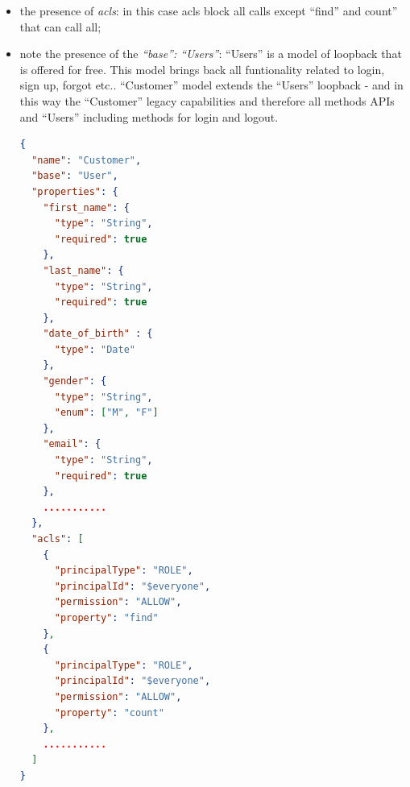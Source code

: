 \begin{itemize}
\begin{itemize}
\item the presence of \emph{acls}: in this case acls block all calls except “find” and count” that can call all;
\item note the presence of the \emph{“base”: “Users”}: “Users” is a model of loopback that is offered for free. This model brings back all funtionality related to login, sign up, forgot etc.. “Customer” model extends the “Users” loopback - and in this way the “Customer” legacy capabilities and therefore all methods APIs and “Users” including methods for login and logout.
\begin{lstlisting}[language=json]
{
  "name": "Customer",
  "base": "User",
  "properties": {
    "first_name": {
      "type": "String",
      "required": true
    },
    "last_name": {
      "type": "String",
      "required": true
    },
    "date_of_birth" : {
      "type": "Date"
    },
    "gender": {
      "type": "String",
      "enum": ["M", "F"]
    },
    "email": {
      "type": "String",
      "required": true
    },
    ...........
  },
  "acls": [
    {
      "principalType": "ROLE",
      "principalId": "$everyone",
      "permission": "ALLOW",
      "property": "find"
    },
    {
      "principalType": "ROLE",
      "principalId": "$everyone",
      "permission": "ALLOW",
      "property": "count"
    },
    ...........
  ]
}
\end{lstlisting}
\end{itemize}
\end{itemize}

